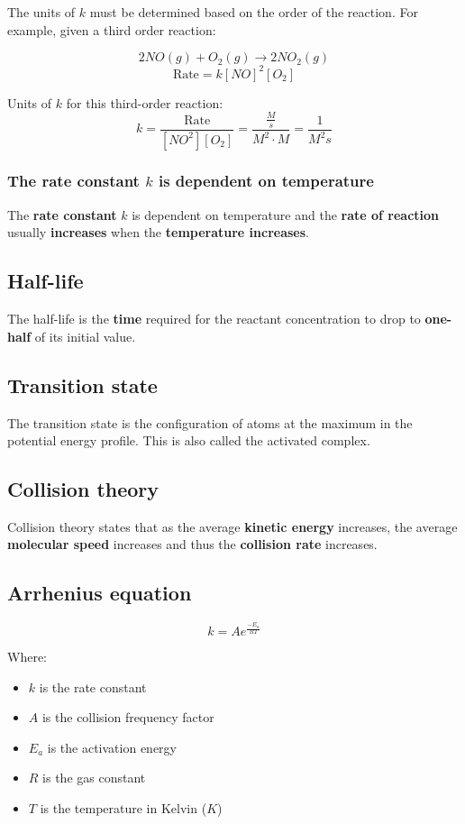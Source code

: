 \documentclass[11pt]{article}
\begin{document}
The units of \(k\) must be determined based on the order of the reaction. For example, given a third order reaction:

\[2NO(g) + O_2(g) \rightarrow 2NO_2 (g)\]
\[\text{Rate} = k[NO]^2[O_2]\]

Units of \(k\) for this third-order reaction:
\[k = \frac{\text{Rate}}{[NO^2][O_2]} = \frac{\frac{M}{s}}{M^2 \cdot M} = \frac{1}{M^2 s}\]
\subsubsection{The rate constant \(k\) is dependent on temperature}
\label{sec:org1b0cca3}
The \textbf{rate constant} \(k\) is dependent on temperature and the \textbf{rate of reaction} usually \textbf{increases} when the \textbf{temperature increases}.
\subsection{Half-life}
\label{sec:org83db6d7}
The half-life is the \textbf{time} required for the reactant concentration to drop to \textbf{one-half} of its initial value.
\subsection{Transition state}
\label{sec:org41518bc}
The transition state is the configuration of atoms at the maximum in the potential energy profile. This is also called the activated complex.
\subsection{Collision theory}
\label{sec:org9299746}
Collision theory states that as the average \textbf{kinetic energy} increases, the average \textbf{molecular speed} increases and thus the \textbf{collision rate} increases.

\newpage
\subsection{Arrhenius equation}
\label{sec:org0e27971}
\[k = Ae^{\frac{-E_a}{RT}}\]

Where:
\begin{itemize}
\item \(k\) is the rate constant
\item \(A\) is the collision frequency factor
\item \(E_a\) is the activation energy
\item \(R\) is the gas constant
\item \(T\) is the temperature in Kelvin (\(\unit{K}\))
\end{itemize}
\end{document}

